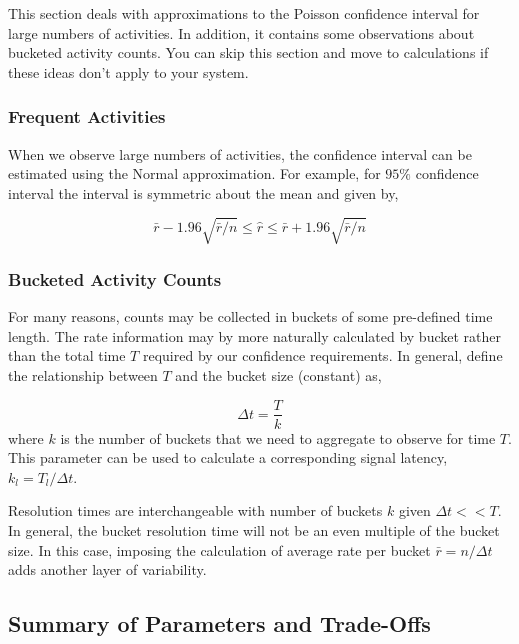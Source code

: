 \documentclass{article}
\begin{document}
This section deals with approximations to the Poisson confidence interval for large numbers of activities. In
addition, it contains some observations about bucketed activity counts. You can skip this section and
move to calculations if these ideas don't apply to your system.

\subsubsection{Frequent Activities} 

When we observe large numbers of activities, the confidence interval can be estimated using the Normal
approximation. For example, for $95\%$ confidence interval the interval is symmetric about the mean
and given by,

\begin{equation}
    \label{eq:largenconf}
    \bar{r} - 1.96 \sqrt{\bar{r}/n} \leq \hat{r} \leq \bar{r} + 1.96 \sqrt{\bar{r}/n}
\end{equation}

\subsubsection{Bucketed Activity Counts}

For many reasons, counts may be collected in buckets of some pre-defined time length.  The rate information
may by more naturally calculated by bucket rather than the total time $T$ required by our confidence
requirements. In general, define the relationship between $T$ and the bucket size (constant) as,

\begin{equation}
    \label{eq:bucket}
    \Delta t = \frac{T}{k}
\end{equation}
where $k$ is the number of buckets that we need to aggregate to observe for time $T$. This parameter
can be used to calculate a corresponding signal latency, $k_l = T_l/\Delta t$.

Resolution times are interchangeable with number of buckets $k$ given $\Delta t << T$.  In general, the
bucket resolution time will not be an even multiple of the bucket size.  In this case, imposing the calculation
of average rate per bucket $\bar{r} = n/\Delta t$ adds another layer of variability.

\subsection{Summary of Parameters and Trade-Offs}
\end{document}
